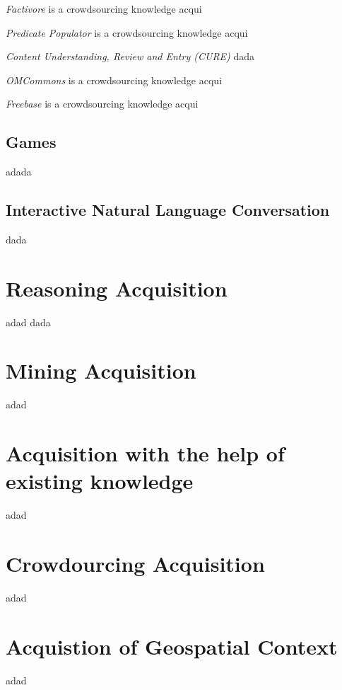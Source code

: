 \emph{Factivore} is a crowdsourcing knowledge acqui

\emph{Predicate Populator} is a crowdsourcing knowledge acqui

\emph{Content Understanding, Review and Entry (CURE)} dada

\emph{OMCommons} is a crowdsourcing knowledge acqui

\emph{Freebase} is a crowdsourcing knowledge acqui

\subsection{Games}
adada


\subsection{Interactive Natural Language Conversation}
dada

\section{Reasoning Acquisition}
adad dada

\section{Mining Acquisition}
\label{section:MiningAcquisition}
adad

\section{Acquisition with the help of existing knowledge}
adad

\section{Crowdourcing Acquisition}
adad

\section{Acquistion of Geospatial Context}
adad
